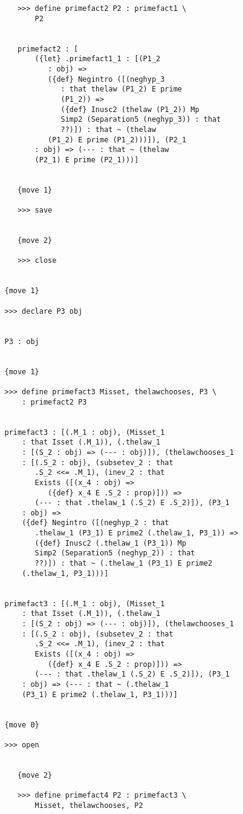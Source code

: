\documentclass[12pt]{article}
\begin{document}
\begin{verbatim}
      >>> define primefact2 P2 : primefact1 \
          P2


      primefact2 : [
          ({let} .primefact1_1 : [(P1_2 
             : obj) => 
             ({def} Negintro ([(neghyp_3 
                : that thelaw (P1_2) E prime 
                (P1_2)) => 
                ({def} Inusc2 (thelaw (P1_2)) Mp 
                Simp2 (Separation5 (neghyp_3)) : that 
                ??)]) : that ~ (thelaw 
             (P1_2) E prime (P1_2)))]), (P2_1 
          : obj) => (--- : that ~ (thelaw 
          (P2_1) E prime (P2_1)))]


      {move 1}

      >>> save


      {move 2}

      >>> close


   {move 1}

   >>> declare P3 obj


   P3 : obj


   {move 1}

   >>> define primefact3 Misset, thelawchooses, P3 \
       : primefact2 P3


   primefact3 : [(.M_1 : obj), (Misset_1 
       : that Isset (.M_1)), (.thelaw_1 
       : [(S_2 : obj) => (--- : obj)]), (thelawchooses_1 
       : [(.S_2 : obj), (subsetev_2 : that 
          .S_2 <<= .M_1), (inev_2 : that 
          Exists ([(x_4 : obj) => 
             ({def} x_4 E .S_2 : prop)])) => 
          (--- : that .thelaw_1 (.S_2) E .S_2)]), (P3_1 
       : obj) => 
       ({def} Negintro ([(neghyp_2 : that 
          .thelaw_1 (P3_1) E prime2 (.thelaw_1, P3_1)) => 
          ({def} Inusc2 (.thelaw_1 (P3_1)) Mp 
          Simp2 (Separation5 (neghyp_2)) : that 
          ??)]) : that ~ (.thelaw_1 (P3_1) E prime2 
       (.thelaw_1, P3_1)))]


   primefact3 : [(.M_1 : obj), (Misset_1 
       : that Isset (.M_1)), (.thelaw_1 
       : [(S_2 : obj) => (--- : obj)]), (thelawchooses_1 
       : [(.S_2 : obj), (subsetev_2 : that 
          .S_2 <<= .M_1), (inev_2 : that 
          Exists ([(x_4 : obj) => 
             ({def} x_4 E .S_2 : prop)])) => 
          (--- : that .thelaw_1 (.S_2) E .S_2)]), (P3_1 
       : obj) => (--- : that ~ (.thelaw_1 
       (P3_1) E prime2 (.thelaw_1, P3_1)))]


   {move 0}

   >>> open


      {move 2}

      >>> define primefact4 P2 : primefact3 \
          Misset, thelawchooses, P2



\end{verbatim}
\end{document}

